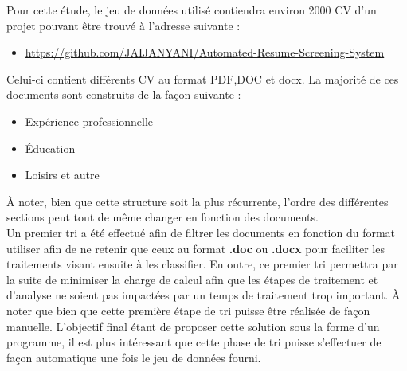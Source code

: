 \documentclass[memoire.tex]{subfiles}
\begin{document}
Pour cette étude, le jeu de données utilisé contiendra environ 2000 CV  d'un projet pouvant être trouvé à l'adresse suivante : \begin{itemize}
\item \url{https://github.com/JAIJANYANI/Automated-Resume-Screening-System}
\end{itemize}
Celui-ci contient différents CV au format PDF,DOC et docx. La majorité de ces documents sont construits de la façon suivante : \begin{itemize}
\item Expérience professionnelle
\item Éducation
\item Loisirs et autre
\end{itemize}
À noter, bien que cette structure soit la plus récurrente, l'ordre des différentes sections peut tout de même changer en fonction des documents.\\
Un premier tri a été effectué afin de filtrer les documents en fonction du format utiliser afin de ne retenir que ceux au format \textbf{.doc} ou \textbf{.docx} pour faciliter les traitements visant ensuite à les classifier. En outre, ce premier tri permettra par la suite de minimiser la charge de calcul afin que les étapes de traitement et d'analyse ne soient pas impactées par un temps de traitement trop important. À noter que bien que cette première étape de tri puisse être réalisée de façon manuelle. L'objectif final étant de proposer cette solution sous la forme d'un programme, il est plus intéressant que cette phase de tri puisse s'effectuer de façon automatique une fois le jeu de données fourni.
\end{document}
